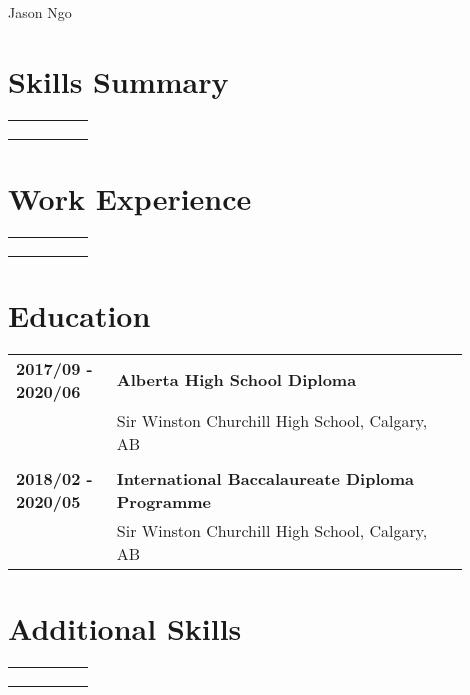 \documentclass[letterpaper]{article}
\begin{document}
    \begin{center}
        \Large
        Jason Ngo

        \normalsize
        \noindent{\rule{\linewidth}{0.4pt}}
    \end{center}

    \section*{Skills Summary}
        \begin{tabular}{p{0.2\linewidth}p{0.7\linewidth}} 
            \textbf{} & \large\textbf{} \\
            & \\
            \\
        \end{tabular}
    \section*{Work Experience}
        \begin{tabular}{p{0.2\linewidth}p{0.7\linewidth}} 
            \textbf{} & \large\textbf{} \\
            & \\
            \\
        \end{tabular}
    \section*{Education}
        \begin{tabular}{p{0.2\linewidth}p{0.7\linewidth}} 
            \textbf{2017/09 - 2020/06} & \large\textbf{Alberta High School Diploma} \\
            & Sir Winston Churchill High School, Calgary, AB \\
            \\
            \textbf{2018/02 - 2020/05} & \large\textbf{International Baccalaureate Diploma Programme} \\
            & Sir Winston Churchill High School, Calgary, AB
        \end{tabular}
    \section*{Additional Skills}
        \begin{tabular}{p{0.2\linewidth}p{0.7\linewidth}} 
            \textbf{} & \large\textbf{} \\
            & \\
            \\
        \end{tabular}
\end{document}
